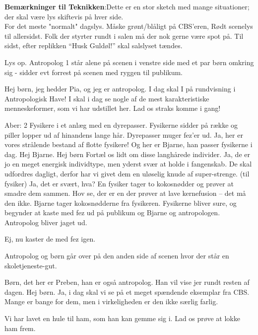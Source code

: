 \documentclass[a4paper,12pt]{article}
\begin{document}
\begin{sketch}

\textbf{Bemærkninger til Teknikken}:Dette er en stor sketch med mange situationer; der skal være lys skiftevis på hver side.\\ For det meste "normalt" dagslys. Måske grønt/blåligt på CBS'eren, Rødt scenelys til allersidst. Folk der styrter rundt i salen må der nok gerne være spot på. 
Til sidst, efter replikken ``Husk Guldøl!'' skal salslyset tændes.


\scene Lys op. Antropolog 1 står alene på scenen i venstre side med et par børn omkring sig - sidder evt forrest på scenen med ryggen til publikum.

 Hej børn, jeg hedder Pia, og jeg er antropolog. I dag skal I på rundvisning i Antropologisk Have! I skal i dag se nogle af de mest karakteristiske menneskeformer, som vi har udstillet her. Lad os straks komme i gang!
 

\scene Aber: 2 Fysikere i et anlæg med en dyrepasser. Fysikerne sidder på række og piller lopper ud af hinandens lange hår. Dyrepasser muger fez'er ud.
 Ja, her er vores strålende bestand af flotte fysikere! Og her er Bjarne, han passer fysikerne i dag. Hej Bjarne. 
 Hej børn
Fortæl os lidt om disse langhårede individer.
Ja, de er jo en meget energisk individtype, men yderst svær at holde i fangenskab. De skal udfordres dagligt, derfor har vi givet dem en uløselig knude af super-strenge. (til fysiker) Ja, det er svært, hva?
\scene En fysiker tager to kokosnødder og prøver at smadre dem sammen.
Hov se, der er en der prøver at lave kernefusion -- det må den ikke.
\scene Bjarne tager kokosnødderne fra fysikeren. Fysikerne bliver sure, og begynder at kaste med fez ud på publikum og Bjarne og antropologen. Antropolog bliver jaget ud.

Ej, nu kaster de med fez igen. 

\scene Antropolog og børn går over på den anden side af scenen hvor der står en skoletjeneste-gut.

Børn, det her er Preben, han er også antropolog. Han vil vise jer rundt resten af dagen. 
Hej børn. Ja, i dag skal vi se på et meget spændende eksemplar fra CBS. Mange er bange for dem, men i virkeligheden er den ikke særlig farlig.

Vi har lavet en hule til ham, som han kan gemme sig i. Lad os prøve at lokke ham frem.


\end{sketch}
\end{document}
